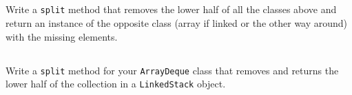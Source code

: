 \documentclass[a4paper, 11pt]{article}
\begin{document}
\subsection{}

Write a \texttt{split} method that removes the lower half of all the classes
above and return an instance of the opposite class (array if linked or the
other way around) with the missing elements.


\subsection{}

Write a \texttt{split} method for your \texttt{ArrayDeque} class that removes
and returns the lower half of the collection in a \texttt{LinkedStack} object.
\end{document}
